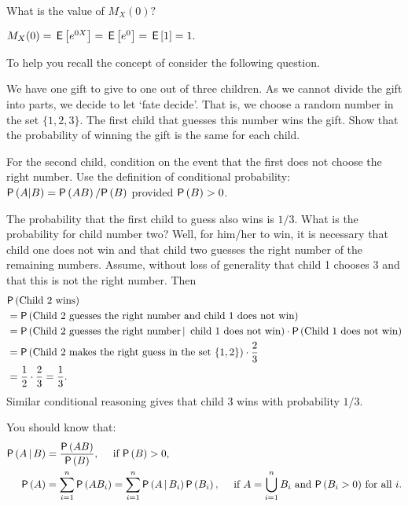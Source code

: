 \begin{extra}
  What is the value of $M_X(0)?$
\begin{solution}
    $M_X(0) = \,\mathsf{E}\left[e^{0 X}\right] = \,\mathsf{E}\left[e^0\right] = \,\mathsf{E}\left[1\right] = 1.$
\end{solution}
\end{extra}

To help you recall the concept of  consider the following question.
\begin{exercise}%
  We have  one gift to give to one out of three children. As we cannot
  divide the gift into parts, we decide to let `fate decide'. That
  is, we choose a random number in the set $\{1, 2, 3\}$. The first
  child that guesses this number wins the gift. Show that the
  probability of winning the gift is the same for each child.
\begin{hint}
    For the second child, condition on the event that the first does not choose the right number.
    Use the definition of conditional probability:
    $\P{A|B} = \P{AB}/\P{B}$ provided $\P{B}>0$.
\end{hint}
\begin{solution}
    The probability that the first child to guess also wins is
    $1/3$. What is the probability for child number two? Well, for
    him/her to win, it is necessary that child one does not win and
    that child two guesses the right number of the remaining
    numbers. Assume, without loss of generality that child 1 chooses
    $3$ and that this is not the right number. Then 
    \begin{equation*}
      \begin{split}
&\P{\text{Child  2 wins}} \\
&= \P{\text{Child 2 guesses the right number and child 1 does not win}} \\
&= \P{\text{Child 2 guesses the right number} \given \text{ child 1 does not win}}
\cdot \P{\text{Child 1 does not win}} \\
&= \P{\text{Child 2 makes the right guess in the set $\{1,2\}$}}\cdot \frac 23 \\
&= \frac 1 2\cdot \frac 23  = \frac 1 3.
      \end{split}
    \end{equation*}
    Similar conditional reasoning gives that child 3 wins with probability $1/3$. 
\end{solution}
\end{exercise}

You should know that:
\begin{subequations}
\begin{align}
\P{A\given B} & = \frac{\P{AB}}{\P{B}}, \quad\text{ if } \P{B}>0, \\
  \P{A} &= \sum_{i=1}^n \P{A B_i} = \sum_{i=1}^n \P{A\given B_i} \P{B_i}, \quad\text{ if  $A=\bigcup_{i=1}^n B_i$ and $\P{B_i>0}$ for all $i$}. \label{eq:70}
\end{align}
\end{subequations}


